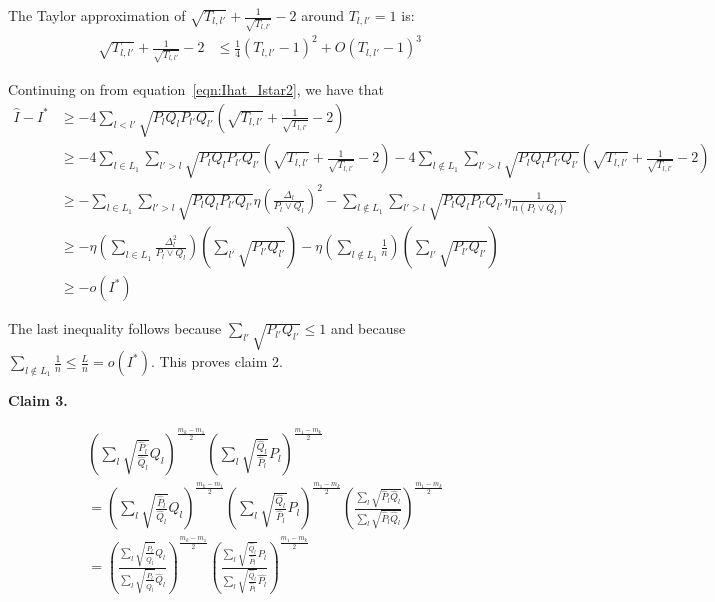 \documentclass{article}
\begin{document}
The Taylor approximation of $\sqrt{T_{l,l'}} + \frac{1}{\sqrt{T_{l,l'}}} - 2$ around $T_{l,l'}=1$ is:
\begin{align*}
\sqrt{T_{l,l'}} + \frac{1}{\sqrt{T_{l,l'}}} -2  &\leq 
  \frac{1}{4} (T_{l,l'} - 1)^2 + O (T_{l,l'}-1)^3 
\end{align*}

Continuing on from equation~\ref{eqn:Ihat_Istar2}, we have that
\begin{align*}
\hat{I} - I^* &\geq - 4 \sum_{l < l'} \sqrt{P_l Q_l P_{l'} Q_{l'}} 
    \left( \sqrt{T_{l,l'}} + \frac{1}{\sqrt{T_{l,l'}}} - 2 \right) \\
&\geq - 4 \sum_{l \in L_1} \sum_{l' > l} \sqrt{P_l Q_l P_{l'} Q_{l'}} 
    \left( \sqrt{T_{l,l'}} + \frac{1}{\sqrt{T_{l,l'}}} - 2 \right) 
     - 4 \sum_{l \notin L_1} \sum_{l' > l} \sqrt{P_l Q_l P_{l'} Q_{l'}} 
    \left( \sqrt{T_{l,l'}} + \frac{1}{\sqrt{T_{l,l'}}} - 2 \right) \\
  &\geq - \sum_{l \in L_1} \sum_{l' > l} \sqrt{P_l Q_l P_{l'} Q_{l'}} 
             \eta \left( \frac{\Delta_l}{P_l \vee Q_l}  \right)^2 
        - \sum_{l \notin L_1} \sum_{l' > l} \sqrt{P_l Q_l P_{l'} Q_{l'}} 
             \eta \frac{1}{n (P_l \vee Q_l)} \\
 &\geq - \eta \left( \sum_{l \in L_1} \frac{\Delta_l^2}{P_l \vee Q_l} \right)
         \left( \sum_{l'}  \sqrt{P_{l'}Q_{l'}} \right) 
       - \eta \left( \sum_{l \notin L_1} \frac{1}{n} \right) 
          \left( \sum_{l'} \sqrt{P_{l'} Q_{l'} } \right) \\
 &\geq - o(I^*)
\end{align*}

The last inequality follows because $\sum_{l'} \sqrt{P_{l'} Q_{l'}} \leq 1$ and because $\sum_{l \notin L_1} \frac{1}{n} \leq \frac{L}{n} = o(I^*)$. This proves claim 2.

\textbf{Claim 3.} 

\begin{align*}
& \left( \sum_l \sqrt{\frac{\hat{P}_l}{\hat{Q}_l}} Q_l \right)^{\frac{m_k - m_1}{2}} 
 \left( \sum_l \sqrt{\frac{\hat{Q}_l}{\hat{P}_l}} P_l \right)^{\frac{m_1 - m_k}{2}} \\
&= \left( \sum_l \sqrt{\frac{\hat{P}_l}{\hat{Q}_l}} Q_l \right)^{\frac{m_k - m_1}{2}} 
 \left( \sum_l \sqrt{\frac{\hat{Q}_l}{\hat{P}_l}} P_l \right)^{\frac{m_1 - m_k}{2}} 
   \left( \frac{\sum_l \sqrt{\hat{P}_l \hat{Q}_l}}{\sum_l \sqrt{\hat{P}_l \hat{Q}_l}} \right)^{\frac{m_1 - m_k}{2}} \\
&=  \left( 
   \frac{\sum_l \sqrt{\frac{\hat{P}_l}{\hat{Q}_l}} Q_l}
        {\sum_l \sqrt{\frac{\hat{P}_l}{\hat{Q}_l}} \hat{Q}_l} 
     \right)^{\frac{m_k - m_1}{2}} 
   \left( \frac{\sum_l \sqrt{\frac{\hat{Q}_l}{\hat{P}_l}} P_l}
         {\sum_l \sqrt{\frac{\hat{Q}_l}{\hat{P}_l}} \hat{P_l} } \right)^{\frac{m_1 - m_k}{2}} 
\end{align*}
\end{document}
